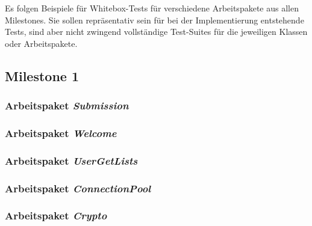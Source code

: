 \lstset{
    language=Java,
    basicstyle=\ttfamily\selectfont\scriptsize,
}

\newcommand{\testlisting}[1]{}

Es folgen Beispiele für Whitebox-Tests für verschiedene Arbeitspakete aus allen Milestones.
Sie sollen repräsentativ sein für bei der Implementierung entstehende Tests, sind aber nicht zwingend vollständige
Test-Suites für die jeweiligen Klassen oder Arbeitspakete.

\subsection{Milestone 1}\label{subsec:milestone1}

\subsubsection{Arbeitspaket \emph{Submission}}
\testlisting{SubmissionBackingTest}
\testlisting{SubmissionServiceTest}
\testlisting{SubmissionRepositoryTest}

\subsubsection{Arbeitspaket \emph{Welcome}}
\testlisting{LoginServiceTest}

\subsubsection{Arbeitspaket \emph{UserGetLists}}
\testlisting{UserRepositoryGetListTest}

\subsubsection{Arbeitspaket \emph{ConnectionPool}}
\testlisting{TransactionTest}
\testlisting{ConnectionPoolTest}

\subsubsection{Arbeitspaket \emph{Crypto}}
\testlisting{HashingTest}

\testlisting{ScientificForumServiceTest}

